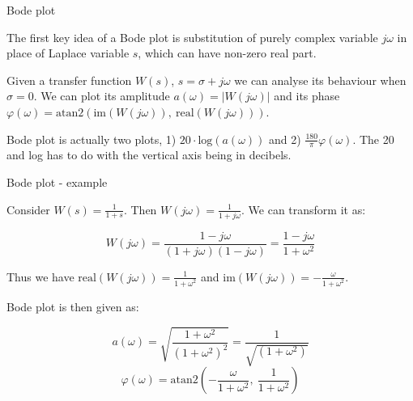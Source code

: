 \documentclass{beamer}
\begin{document}
\begin{frame}{Bode plot}
\begin{flushleft}

The first key idea of a Bode plot is substitution of purely complex variable $j \omega$ in place of Laplace variable $s$, which can have non-zero real part.

\bigskip

Given a transfer function $W(s)$, $s = \sigma + j \omega$ we can analyse its behaviour when $\sigma = 0$. We can plot its amplitude $a(\omega) = \left| W(j \omega) \right|$ and its phase $\varphi(\omega) = \text{atan2}( \text{im}(W(j \omega)), \ \text{real}(W(j \omega))  )$.

\bigskip
 
Bode plot is actually two plots, 1) $20 \cdot \text{log}(a(\omega))$ and 2) $\frac{180}{\pi} \varphi(\omega)$. The 20 and log has to do with the vertical axis being in decibels. 

\end{flushleft}
\end{frame}




\begin{frame}{Bode plot - example}
\begin{flushleft}

Consider $W(s) = \frac{1}{1 + s}$. Then $W(j \omega) = \frac{1}{1 + j \omega}$. We can transform it as:

\begin{equation}
    W(j \omega) = \frac{1 - j \omega}{(1 + j \omega)(1 - j \omega)} = 
    \frac{1 - j \omega}{1 + \omega^2}
\end{equation}

Thus we have $\text{real}(W(j \omega)) = \frac{1}{1 + \omega^2}$ and $\text{im}(W(j \omega)) = - \frac{\omega}{1 + \omega^2}$.

\bigskip
 
Bode plot is then given as:

\begin{equation}
   a(\omega) = \sqrt{\frac{1 + \omega^2}{(1 + \omega^2)^2}} = 
   \frac{1}{\sqrt{(1 + \omega^2)}}
\end{equation}
\begin{equation}
   \varphi(\omega) = \text{atan2} \left(-\frac{\omega}{1 + \omega^2}, \ \frac{1}{1 + \omega^2} \right)
\end{equation}

\end{flushleft}
\end{frame}
\end{document}
